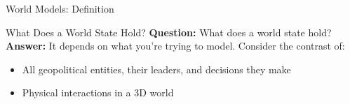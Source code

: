 \begin{frame}{World Models: Definition}
  \begin{center}
  \end{center}
\end{frame}

\begin{frame}{What Does a World State Hold?}
    \textbf{Question:} What does a world state hold?\\[0.4em]

    \textbf{Answer:} It depends on what you're trying to model. Consider the contrast of:
    \begin{itemize}\itemsep0.24em
      \item [A)] All geopolitical entities, their leaders, and decisions they make
      \item [B)] Physical interactions in a 3D world
    \end{itemize}
  \end{frame}

